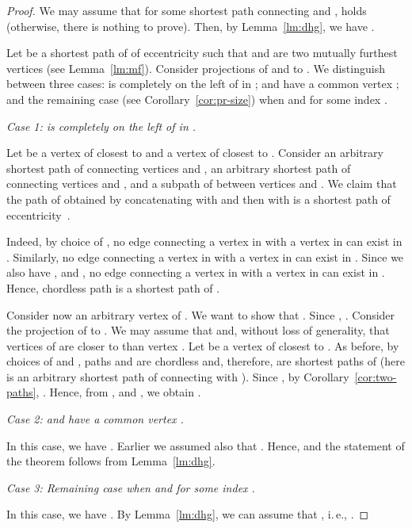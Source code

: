 \documentclass[10pt]{llncs}
\makeatletter
\newcommand{\ie}{i.\,e.\@ifnextchar{,}{}{~}}
\makeatother
\begin{document}
\begin{proof} 
We may assume that for some shortest path  connecting  and ,  holds (otherwise, there is nothing to prove).
Then, by Lemma~\ref{lm:dhg}, we have .

Let  be a shortest path of  of eccentricity  such that  and  are two mutually furthest vertices (see Lemma~\ref{lm:mf}). 
Consider projections of  and  to . 
We distinguish between three cases: 
 is completely on the left of  in ;  and  have a common vertex ; and the remaining case (see Corollary~\ref{cor:pr-size}) when  and  for some index .

\medskip

\noindent
\emph{Case 1:  is completely on the left of  in .}    

\medskip
\noindent
Let  be a vertex of  closest to  and  a vertex of  closest to . 
Consider an arbitrary shortest path  of  connecting vertices  and , an arbitrary shortest path  of  connecting vertices  and , and a subpath  of  between vertices  and . 
We claim that the path  of  obtained by concatenating  with  and then with  is a shortest path of eccentricity~. 

Indeed, by choice of , no edge connecting a vertex in  with a vertex in  can exist in . 
Similarly, no edge connecting a vertex in  with a vertex in  can exist in . 
Since we also have ,  and , no edge connecting a vertex in   with a vertex in  can exist in . 
Hence, chordless path  is a shortest path of .

Consider now an arbitrary vertex  of . 
We want to show that . 
Since , . 
Consider the projection of  to . 
We may assume that  and, without loss of generality, that vertices of  are closer to  than vertex . 
Let  be a vertex of  closest to .
As before, by choices of  and , paths  and  are chordless and, therefore, are shortest paths of  (here  is an arbitrary shortest path of  connecting  with ). 
Since , by Corollary~\ref{cor:two-paths}, . 
Hence, from ,  and , we obtain .

\medskip
\noindent
\emph{Case 2:  and  have a common vertex .} 

\medskip
\noindent
In this case, we have . 
Earlier we assumed also that .
Hence,  and the statement of the theorem follows from Lemma~\ref{lm:dhg}. 

\medskip
\noindent
\emph{Case 3: Remaining case when  and  for some index .}

\medskip
\noindent
In this case, we have . 
By Lemma~\ref{lm:dhg}, we can assume that , \ie, .


\end{proof}
\end{document}
